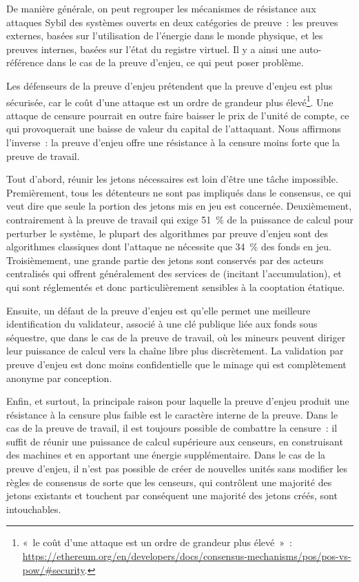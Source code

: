 De manière générale, on peut regrouper les mécanismes de résistance aux attaques Sybil des systèmes ouverts en deux catégories de preuve~: les preuves externes, basées sur l'utilisation de l'énergie dans le monde physique, et les preuves internes, basées sur l'état du registre virtuel. Il y a ainsi une auto-référence dans le cas de la preuve d'enjeu, ce qui peut poser problème.


Les défenseurs de la preuve d'enjeu prétendent que la preuve d'enjeu est plus sécurisée, car le coût d'une attaque est un ordre de grandeur plus élevé\footnote{«~le coût d'une attaque est un ordre de grandeur plus élevé~»~: \url{https://ethereum.org/en/developers/docs/consensus-mechanisms/pos/pos-vs-pow/\#security}.}. Une attaque de censure pourrait en outre faire baisser le prix de l'unité de compte, ce qui provoquerait une baisse de valeur du capital de l'attaquant. Nous affirmons l'inverse~: la preuve d'enjeu offre une résistance à la censure moins forte que la preuve de travail.

Tout d'abord, réunir les jetons nécessaires est loin d'être une tâche impossible. Premièrement, tous les détenteurs ne sont pas impliqués dans le consensus, ce qui veut dire que seule la portion des jetons mis en jeu est concernée. Deuxièmement, contrairement à la preuve de travail qui exige 51~\% de la puissance de calcul pour perturber le système, le plupart des algorithmes par preuve d'enjeu sont des algorithmes classiques dont l'attaque ne nécessite que 34~\% des fonds en jeu. Troisièmement, une grande partie des jetons sont conservés par des acteurs centralisés qui offrent généralement des services de  (incitant l'accumulation), et qui sont réglementés et donc particulièrement sensibles à la cooptation étatique.

Ensuite, un défaut de la preuve d'enjeu est qu'elle permet une meilleure identification du validateur, associé à une clé publique liée aux fonds sous séquestre, que dans le cas de la preuve de travail, où les mineurs peuvent diriger leur puissance de calcul vers la chaîne libre plus discrètement. La validation par preuve d'enjeu est donc moins confidentielle que le minage qui est complètement anonyme par conception.

Enfin, et surtout, la principale raison pour laquelle la preuve d'enjeu produit une résistance à la censure plus faible est le caractère interne de la preuve. Dans le cas de la preuve de travail, il est toujours possible de combattre la censure~: il suffit de réunir une puissance de calcul supérieure aux censeurs, en construisant des machines et en apportant une énergie supplémentaire. Dans le cas de la preuve d'enjeu, il n'est pas possible de créer de nouvelles unités sans modifier les règles de consensus de sorte que les censeurs, qui contrôlent une majorité des jetons existants et touchent par conséquent une majorité des jetons créés, sont intouchables.

